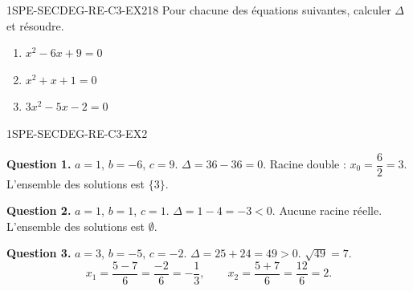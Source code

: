 
\begin{exercice}{1SPE-SECDEG-RE-C3-EX2}{1}{8}
Pour chacune des équations suivantes, calculer $\Delta$ et résoudre.
\begin{enumerate}
  \item $x^2 - 6x + 9 = 0$
  \item $x^2 + x + 1 = 0$
  \item $3x^2 - 5x - 2 = 0$
\end{enumerate}
\end{exercice}



\begin{corrige}{1SPE-SECDEG-RE-C3-EX2}


\textbf{Question 1.} $a = 1$, $b = -6$, $c = 9$. $\Delta = 36 - 36 = 0$.
Racine double : $x_0 = \dfrac{6}{2} = 3$. L'ensemble des solutions est $\{3\}$.

\textbf{Question 2.} $a = 1$, $b = 1$, $c = 1$. $\Delta = 1 - 4 = -3 < 0$.
Aucune racine réelle. L'ensemble des solutions est $\emptyset$.

\textbf{Question 3.} $a = 3$, $b = -5$, $c = -2$. $\Delta = 25 + 24 = 49 > 0$. $\sqrt{49} = 7$.
\[
x_1 = \frac{5 - 7}{6} = \frac{-2}{6} = -\frac{1}{3}, \qquad
x_2 = \frac{5 + 7}{6} = \frac{12}{6} = 2.
\]

\end{corrige}

